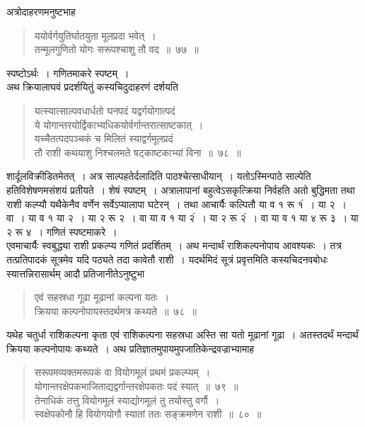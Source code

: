 \documentclass[11pt, openany]{book}
\begin{document}
\newpage
 अत्रोदाहरणमनुष्टभाह\textendash 
\begin{quote}
    \ex
     ययोर्वर्गयुतिर्घातयुता मूलप्रदा भवेत्~। \\
 तन्मूलगुणितो योगः सरूपश्चाशु तौ वद~॥~७७~॥~

\end{quote}

स्पष्टोऽर्थः~। गणितमाकरे स्पष्टम्~। \\

\vspace{-3mm}
 अथ क्रियालाघवं प्रदर्शयितुं कस्यचिदुदाहरणं दर्शयति\textendash 
\begin{quote}
    \ex
    यत्स्यात्साल्पवधार्धतो घनपदं यद्वर्गयोगात्पदं \\
 ये योगान्तरयोर्द्विकाभ्यधिकयोर्वर्गान्तरात्साष्टकात्~। \\
 यच्चैतत्पदपञ्चकं च मिलितं स्याद्वर्गमूलप्रदं \\
 तौ राशी कथयाशु निश्चलमते षट्काष्टकाभ्यां विना~॥~७८~॥~
\end{quote}

शार्दूलविक्रीडितमेतत्~। अत्र साल्पहतेर्दलादिति पाठश्चेत्साधीयान्~। यतोऽस्मिन्पाठे 
साल्पेति हतिविशेषणमसंशयं प्रतीयते~। शेषं स्पष्टम्~। अत्रालापानां 
बहुत्वेऽसकृत्क्रिया निर्वहति अतो बुद्धिमता तथा राशी कल्प्यौ यथैकेनैव 
वर्णेन सर्वेऽप्यालापा घटेरन्~। तथा आचार्यैः कल्पितौ या व १ रू १ं~। 
या २~। वा~। या व १ या २~। या २ रू २~। वा या व १ या २ं~। 
या २ रू २ं~। वा या व १ या ४ रू ३~। या २ रू ४~। गणितं 
स्पष्टमाकरे~। \\

\vspace{-3mm}
 एवमाचार्यैः स्वबुद्ध्या राशी प्रकल्प्य गणितं प्रदर्शितम्~। अथ 
मन्दार्थं राशिकल्पनोपाय आवश्यकः~। तत्र तत्प्रतिपादकं सूत्रमेव यदि 
पठ्यते तदा कावेतौ राशी~। यदर्थमिदं सूत्रं प्रवृत्तमिति कस्यचिदनवबोधः 
स्यात्तन्निरासार्थम् आदौ प्रतिजानीतेऽनुष्टुभा\textendash 
\begin{quote}
    \bs
 एवं सहस्रधा गूढा मूढानां कल्पना यतः~। \\
 क्रियया कल्पनोपायस्तदर्थमत्र कथ्यते~॥~७८~॥~
\end{quote}
 
यथेह चतुर्धा राशिकल्पना कृता एवं राशिकल्पना सहस्रधा अस्ति सा 
यतो मूढानां गूढा~। अतस्तदर्थं मन्दार्थं क्रियया कल्पनोपायः कथ्यते~।
\newpage
अथ प्रतिज्ञातमुपायमुपजातिकेन्द्रवज्राभ्यामाह\textendash 
\begin{quote}
    \bs
     सरूपमव्यक्तमरूपकं वा वियोगमूलं प्रथमं प्रकल्प्यम्~। \\
 योगान्तरक्षेपकभाजिताद्यद्वर्गान्तरक्षेपकतः पदं स्यात्~॥~७९~॥~\\
 तेनाधिकं तत्तु वियोगमूलं स्याद्योगमूलं तु तयोस्तु वर्गौ~। \\
 स्वक्षेपकोनौ हि वियोगयोगौ स्यातां ततः सङ्क्रमणेन राशी~॥~८०~॥~
\end{quote}
\end{document}
